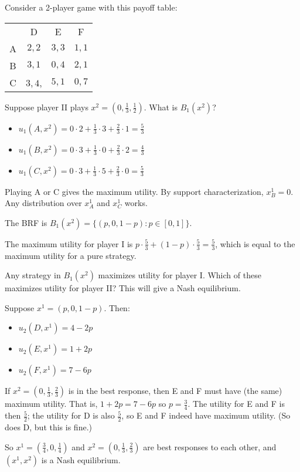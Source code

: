 \documentclass[12pt,letterpaper]{report}
\begin{document}
\begin{ex}
  Consider a 2-player game with this payoff table:
  \begin{center}
    \renewcommand{\arraystretch}{1.25}
    \begin{tabular}{c |c|c|c|}
      \multicolumn{1}{c}{} & \multicolumn{1}{c}{D} & \multicolumn{1}{c}{E}
        & \multicolumn{1}{c}{F} \\
      \cline{2-4}
      A & $2, 2$ & $3, 3$ & $1, 1$ \\
      \cline{2-4}
      B & $3, 1$ & $0, 4$ & $2, 1$ \\
      \cline{2-4}
      C & $3, 4$, & $5, 1$ & $0, 7$ \\
      \cline{2-4}
    \end{tabular}
  \end{center}

  Suppose player II plays $x^2 = (0, \frac{1}{3}, \frac{1}{2})$.
  What is $B_1(x^2)$?
  \begin{itemize}
    \item $u_1(A, x^2) = 0 \cdot 2 + \frac{1}{3} \cdot 3 + \frac{2}{3} \cdot 1 = \frac{5}{3}$
    \item $u_1(B, x^2) = 0 \cdot 3 + \frac{1}{3} \cdot 0 + \frac{2}{3} \cdot 2 = \frac{4}{3}$
    \item $u_1(C, x^2) = 0 \cdot 3 + \frac{1}{3} \cdot 5 + \frac{2}{3} \cdot 0 = \frac{5}{3}$
  \end{itemize}
  Playing A or C gives the maximum utility.
  By support characterization, $x_B^1 = 0$.
  Any distribution over $x_A^1$ and $x_C^1$ works.

  The BRF is $B_1(x^2) = \{ (p, 0, 1 - p) : p \in [0, 1] \}$.

  The maximum utility for player I is
  $p \cdot \frac{5}{3} + (1 - p) \cdot \frac{5}{3} = \frac{5}{3}$, which is equal to the maximum
  utility for a pure strategy.

  Any strategy in $B_1(x^2)$ maximizes utility for player I.
  Which of these maximizes utility for player II?
  This will give a Nash equilibrium.

  Suppose $x^1 = (p, 0, 1 - p)$.
  Then:
  \begin{itemize}
    \item $u_2(D, x^1) = 4 - 2p$
    \item $u_2(E, x^1) = 1 + 2p$
    \item $u_2(F, x^1) = 7 - 6p$
  \end{itemize}
  If $x^2 = (0, \frac{1}{3}, \frac{2}{3})$ is in the best response, then E and F must have (the
  same) maximum utility.
  That is, $1 + 2p = 7 - 6p$ so $p = \frac{3}{4}$.
  The utility for E and F is then $\frac{5}{2}$; the utility for D is also $\frac{5}{2}$, so E and F
  indeed have maximum utility.
  (So does D, but this is fine.)

  So $x^1 = (\frac{3}{4}, 0, \frac{1}{4})$ and $x^2 = (0, \frac{1}{3}, \frac{2}{3})$ are best
  responses to each other, and $(x^1, x^2)$ is a Nash equilibrium.
\end{ex}
\end{document}
